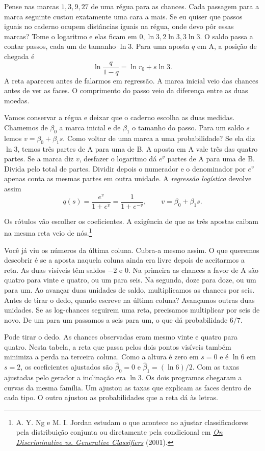 \documentclass[12pt,oneside]{article}
\newcommand{\bookanchor}[1]{\phantomsection\label{#1}}
\begin{document}
Pense nas marcas $1,3,9,27$ de uma régua para as chances. Cada passagem para a marca seguinte custou exatamente uma cara a mais. Se eu quiser que passos iguais no caderno ocupem distâncias iguais na régua, onde devo pôr essas marcas? Tome o logaritmo e elas ficam em $0,\ln 3,2\ln 3,3\ln 3$. O saldo passa a contar passos, cada um de tamanho $\ln 3$. Para uma aposta $q$ em A, a posição de chegada é
\[
             \ln\frac{q}{1-q}=\ln r_0+s\ln 3 .
\]
A reta apareceu antes de falarmos em regressão. A marca inicial veio das chances antes de ver as faces. O comprimento do passo veio da diferença entre as duas moedas.

Vamos\bookanchor{topic-04-3} conservar a régua e deixar que o caderno escolha as duas medidas. Chamemos de $\beta_0$ a marca inicial e de $\beta_1$ o tamanho do passo. Para um saldo $s$ lemos $v=\beta_0+\beta_1s$. Como voltar de uma marca a uma probabilidade? Se ela diz $\ln 3$, temos três partes de A para uma de B. A aposta em A vale três das quatro partes. Se a marca diz $v$, desfazer o logaritmo dá $e^v$ partes de A para uma de B. Divida pelo total de partes. Dividir depois o numerador e o denominador por $e^v$ apenas conta as mesmas partes em outra unidade. A \emph{regressão logística} devolve assim
\[
              q(s)=\frac{e^v}{1+e^v}=\frac{1}{1+e^{-v}},
              \qquad v=\beta_0+\beta_1s .
\]

Os rótulos vão escolher os coeficientes. A exigência de que as três apostas caibam na mesma reta veio de nós.\footnote{A. Y. Ng e M. I. Jordan estudam o que acontece ao ajustar classificadores pela distribuição conjunta ou diretamente pela condicional em \href{https://proceedings.neurips.cc/paper_files/paper/2001/file/7b7a53e239400a13bd6be6c91c4f6c4e-Paper.pdf}{\emph{On Discriminative vs. Generative Classifiers}} (2001).}

Você já viu os números da última coluna. Cubra-a mesmo assim. O que queremos descobrir é se a aposta naquela coluna ainda era livre depois de aceitarmos a reta. As duas visíveis têm saldos $-2$ e $0$. Na primeira as chances a favor de A são quatro para vinte e quatro, ou um para seis. Na segunda, doze para doze, ou um para um. Ao avançar duas unidades de saldo, multiplicamos as chances por seis. Antes de tirar o dedo, quanto escreve na última coluna? Avançamos outras duas unidades. Se as log-chances seguirem uma reta, precisamos multiplicar por seis de novo. De um para um passamos a seis para um, o que dá probabilidade $6/7$.

Pode tirar o dedo. As chances observadas eram mesmo vinte e quatro para quatro. Nesta tabela, a reta que passa pelos dois pontos visíveis também minimiza a perda na terceira coluna. Como a altura é zero em $s=0$ e é $\ln 6$ em $s=2$, os coeficientes ajustados são $\widehat\beta_0=0$ e $\widehat\beta_1=(\ln 6)/2$. Com as taxas ajustadas pelo gerador a inclinação era $\ln 3$. Os dois programas chegaram a curvas da mesma família. Um ajustou as taxas que explicam as faces dentro de cada tipo. O outro ajustou as probabilidades que a reta dá às letras.
\end{document}
